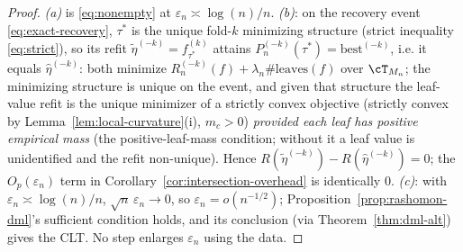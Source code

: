 \begin{proof}
\emph{(a)} is \eqref{eq:nonempty} at $\varepsilon_n\asymp\log(n)/n$. \emph{(b)}:
on the recovery event \eqref{eq:exact-recovery}, $\tau^\ast$ is the unique
fold-$k$ minimizing structure (strict inequality \eqref{eq:strict}), so its refit
$\tilde\eta^{(-k)}=f_{\tau^\ast}^{(k)}$ attains
$P_n^{(-k)}(\tau^\ast)=\text{best}^{(-k)}$, i.e. it equals $\hat\eta^{(-k)}$: both
minimize $R_n^{(-k)}(f)+\lambda_n\#\mathrm{leaves}(f)$ over $\cT_{M_n}$; the
minimizing structure is unique on the event, and given that structure the
leaf-value refit is the unique minimizer of a strictly convex objective (strictly
convex by Lemma~\ref{lem:local-curvature}(i), $m_c>0$) \emph{provided each leaf
has positive empirical mass} (the positive-leaf-mass condition; without it a leaf
value is unidentified and the refit non-unique). Hence
$R(\tilde\eta^{(-k)})-R(\hat\eta^{(-k)})=0$; the $O_p(\varepsilon_n)$ term in
Corollary~\ref{cor:intersection-overhead} is identically $0$. \emph{(c)}: with
$\varepsilon_n\asymp\log(n)/n$, $\sqrt n\,\varepsilon_n\to0$, so
$\varepsilon_n=o(n^{-1/2})$; Proposition~\ref{prop:rashomon-dml}'s sufficient
condition holds, and its conclusion (via Theorem~\ref{thm:dml-alt}) gives the
CLT. No step enlarges $\varepsilon_n$ using the data.
\end{proof}

